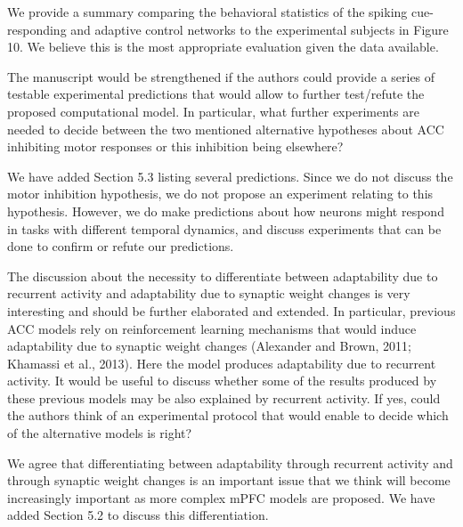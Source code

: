 \documentclass[11pt,paper=letter]{scrartcl}
\begin{document}
We provide a summary comparing
the behavioral statistics of
the spiking cue-responding and adaptive control networks
to the experimental subjects in Figure 10.
We believe this is the most appropriate evaluation
given the data available.

\begin{quoting}
  The manuscript would be strengthened if the authors could provide a
  series of testable experimental predictions that would allow to
  further test/refute the proposed computational model. In particular,
  what further experiments are needed to decide between the two
  mentioned alternative hypotheses about ACC inhibiting motor
  responses or this inhibition being elsewhere?
\end{quoting}

We have added Section 5.3 listing several predictions.
Since we do not discuss the motor inhibition hypothesis,
we do not propose an experiment relating to this hypothesis.
However, we do make predictions about
how neurons might respond in tasks
with different temporal dynamics,
and discuss experiments that can be done
to confirm or refute our predictions.

\begin{quoting}
  The discussion about the necessity to differentiate between
  adaptability due to recurrent activity and adaptability due to
  synaptic weight changes is very interesting and should be further
  elaborated and extended. In particular, previous ACC models rely on
  reinforcement learning mechanisms that would induce adaptability due
  to synaptic weight changes (Alexander and Brown, 2011; Khamassi et
  al., 2013). Here the model produces adaptability due to recurrent
  activity. It would be useful to discuss whether some of the results
  produced by these previous models may be also explained by recurrent
  activity. If yes, could the authors think of an experimental
  protocol that would enable to decide which of the alternative models
  is right?
\end{quoting}

We agree that differentiating
between adaptability
through recurrent activity
and through synaptic weight changes
is an important issue
that we think will become increasingly important
as more complex mPFC models are proposed.
We have added Section 5.2 to discuss
this differentiation.
\end{document}
